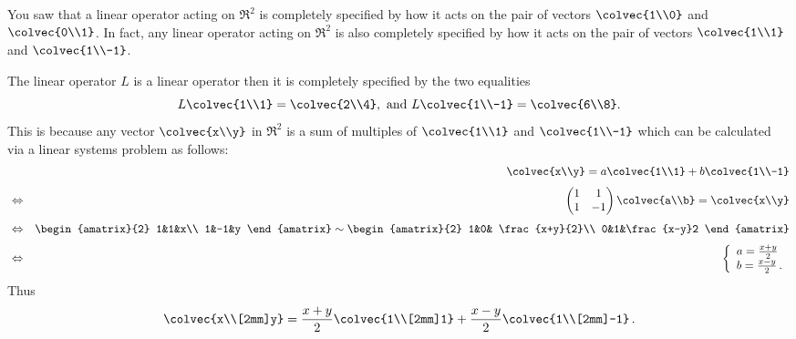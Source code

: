 You saw that a linear operator acting on $\Re^2$ is completely specified by how it acts on the pair of vectors $\colvec{1\\0}$ and $\colvec{0\\1}$. 
In fact, any linear operator acting on $\Re^2$ is also completely specified by how it acts on the pair of vectors $\colvec{1\\1}$ and $\colvec{1\\-1}$.

\begin{example} The linear operator $L$ is a linear operator then it is completely specified \hypertarget{nonstandard r2 basis}{by the two equalities} 
$$
L\colvec{1\\1}= \colvec{2\\4}, {\rm ~and~} L\colvec{1\\-1}=\colvec{6\\8}.
$$ 
This is because any vector $\colvec{x\\y}$ in $\Re^2$ is a sum of multiples of
$\colvec{1\\1}$ and $\colvec{1\\-1}$ which can be calculated via a linear systems problem as follows:
\begin{eqnarray*}&&
\colvec{x\\y}=a\colvec{1\\1}+b\colvec{1\\-1}\\[1mm]
&\Leftrightarrow& 
\begin{pmatrix}
1&1\\
1&-1
\end{pmatrix}
\colvec{a\\b}
=\colvec{x\\y}\\[1mm]
&\Leftrightarrow& 
\begin{amatrix}{2}
1&1&x\\
1&-1&y
\end{amatrix}
\sim \begin{amatrix}{2}
1&0& \frac{x+y}{2}\\
0&1&\frac{x-y}2
\end{amatrix}\\[1mm]
&\Leftrightarrow&
\left\{ 
\begin{array}{l}
a=\frac{x+y}{2}\\
b=\frac{x-y}{2}\, .
\end{array}
\right.
\end{eqnarray*}
Thus
$$
\colvec{x\\[2mm]y}=\frac{x+y}{2}\colvec{1\\[2mm]1}+\frac{x-y}{2}\colvec{1\\[2mm]-1}\, .
$$
\end{example}

